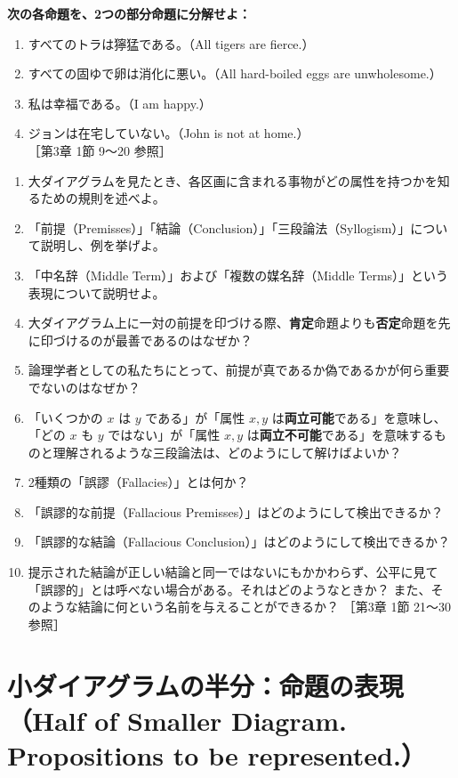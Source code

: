 \documentclass[a4paper,11pt,openany]{ltjsbook}
\begin{document}
\noindent\textbf{次の各命題を、2つの部分命題に分解せよ：}
\begin{enumerate}[label=\textbf{\arabic*.}, start=17]
\item すべてのトラは獰猛である。（All tigers are fierce.）
\item すべての固ゆで卵は消化に悪い。（All hard-boiled eggs are unwholesome.）
\item 私は幸福である。（I am happy.）
\item ジョンは在宅していない。（John is not at home.） \hfill {\small ［第3章 1節 9〜20 参照］}
\end{enumerate}

\begin{enumerate}[label=\textbf{\arabic*.}, start=21]
\item 大ダイアグラムを見たとき、各区画に含まれる事物がどの属性を持つかを知るための規則を述べよ。
\item 「前提（Premisses）」「結論（Conclusion）」「三段論法（Syllogism）」について説明し、例を挙げよ。
\item 「中名辞（Middle Term）」および「複数の媒名辞（Middle Terms）」という表現について説明せよ。
\item 大ダイアグラム上に一対の前提を印づける際、\textbf{肯定}命題よりも\textbf{否定}命題を先に印づけるのが最善であるのはなぜか？
\item 論理学者としての私たちにとって、前提が真であるか偽であるかが何ら重要でないのはなぜか？
\item 「いくつかの $x$ は $y$ である」が「属性 $x, y$ は\textbf{両立可能}である」を意味し、「どの $x$ も $y$ ではない」が「属性 $x, y$ は\textbf{両立不可能}である」を意味するものと理解されるような三段論法は、どのようにして解けばよいか？
\item 2種類の「誤謬（Fallacies）」とは何か？
\item 「誤謬的な前提（Fallacious Premisses）」はどのようにして検出できるか？
\item 「誤謬的な結論（Fallacious Conclusion）」はどのようにして検出できるか？
\item 提示された結論が正しい結論と同一ではないにもかかわらず、公平に見て「誤謬的」とは呼べない場合がある。それはどのようなときか？ また、そのような結論に何という名前を与えることができるか？ \hfill {\small ［第3章 1節 21〜30 参照］}
\end{enumerate}

\section{小ダイアグラムの半分：命題の表現（Half of Smaller Diagram. Propositions to be represented.）}
\end{document}
